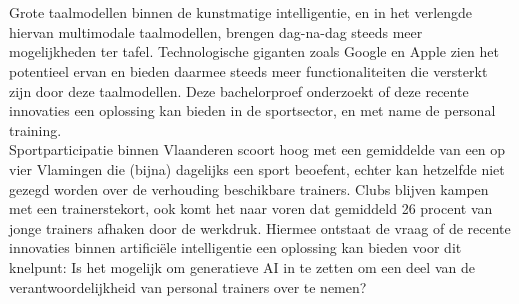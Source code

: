 
%
%
%

%



\chapter*{}
Grote taalmodellen binnen de kunstmatige intelligentie, en in het verlengde hiervan multimodale taalmodellen, brengen dag-na-dag steeds meer mogelijkheden ter tafel.
Technologische giganten zoals Google en Apple zien het potentieel ervan en bieden daarmee steeds meer functionaliteiten die versterkt zijn door deze taalmodellen.
Deze bachelorproef onderzoekt of deze recente innovaties een oplossing kan bieden in de sportsector, en met name de personal training. \\

Sportparticipatie binnen Vlaanderen scoort hoog met een gemiddelde van een op vier Vlamingen die (bijna) dagelijks een sport beoefent, echter kan hetzelfde niet gezegd worden over de verhouding beschikbare trainers.
Clubs blijven kampen met een trainerstekort, ook komt het naar voren dat gemiddeld 26 procent van jonge trainers afhaken door de werkdruk.
Hiermee ontstaat de vraag of de recente innovaties binnen artificiële intelligentie een oplossing kan bieden voor dit knelpunt:
Is het mogelijk om generatieve AI in te zetten om een deel van de verantwoordelijkheid van personal trainers over te nemen? \\

